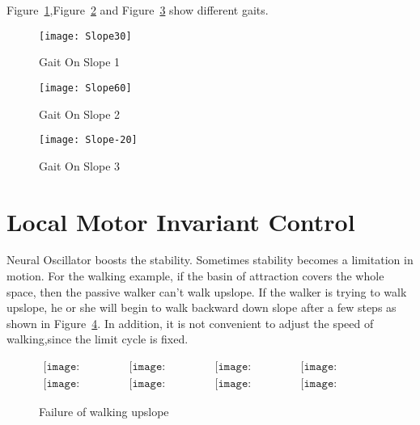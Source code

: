 Figure~\ref{fig:ss1},Figure~\ref{fig:ss2} and Figure~\ref{fig:ss3} show different gaits.

\begin{figure}[!htbp]
  \begin{center}
      \texttt{[image: Slope30]}
    \caption{Gait On Slope 1} 
    \label{fig:ss1}
\end{center}
\end{figure}

\begin{figure}[!htbp]
  \begin{center}
      \texttt{[image: Slope60]}
    \caption{Gait On Slope 2}
    \label{fig:ss2}
\end{center}
\end{figure}

\begin{figure}[!htbp]
  \begin{center}
      \texttt{[image: Slope-20]}
    \caption{Gait On Slope 3}
    \label{fig:ss3}
\end{center}
\end{figure}






\section{Local Motor Invariant Control}
Neural Oscillator boosts the stability.
Sometimes stability becomes a limitation in motion.
For the walking example, if the basin of attraction covers the whole space, then the passive walker can't walk upslope.
If the walker is trying to walk upslope, he or she will begin to walk backward down slope after a few steps as shown in Figure~\ref{fig:localcontrolwalking}.
In addition,  it is not convenient to adjust the speed of walking,since the limit cycle is fixed.




\begin{figure}[!htbp]
  \begin{center}
         $\begin{array}{cccc}
\texttt{[image: UpFall/0001.eps]}&
\texttt{[image: UpFall/0051.eps]}&
\texttt{[image: UpFall/0101.eps]}&
\texttt{[image: UpFall/0151.eps]}
\\
\texttt{[image: UpFall/0201.eps]}&
\texttt{[image: UpFall/0251.eps]}&
\texttt{[image: UpFall/0301.eps]}&
\texttt{[image: UpFall/0351.eps]}
\end{array}$
    \caption{Failure of walking upslope}
    \label{fig:localcontrolwalking}
\end{center}
\end{figure}

